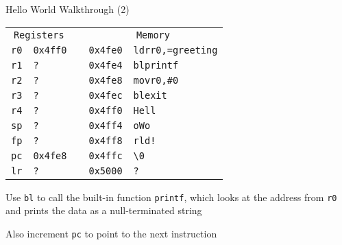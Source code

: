 \begin{frame}{Hello World Walkthrough (2)}
	\begin{alltt}
		\begin{tabular}{ r | l p{5mm} r | l }
			\multicolumn{2}{c}{Registers} &        & \multicolumn{2}{c}{Memory}                              \\
			r0                            & 0x4ff0 &                            & 0x4fe0 & ldr r0, =greeting \\
			r1                            & ?      &                            & 0x4fe4 & bl printf         \\
			r2                            & ?      &                            & 0x4fe8 & mov r0, \#0       \\
			r3                            & ?      &                            & 0x4fec & bl exit           \\
			r4                            & ?      &                            & 0x4ff0 & Hell              \\
			sp                            & ?      &                            & 0x4ff4 & o Wo              \\
			fp                            & ?      &                            & 0x4ff8 & rld!              \\
			pc                            & 0x4fe8 &                            & 0x4ffc & {\textbackslash}0 \\
			lr                            & ?      &                            & 0x5000 & ?                 \\
		\end{tabular}
	\end{alltt}

	Use \texttt{bl} to call the built-in function \texttt{printf}, which looks at the address from \texttt{r0} and prints the data as a null-terminated string

	Also increment \texttt{pc} to point to the next instruction


\end{frame}

